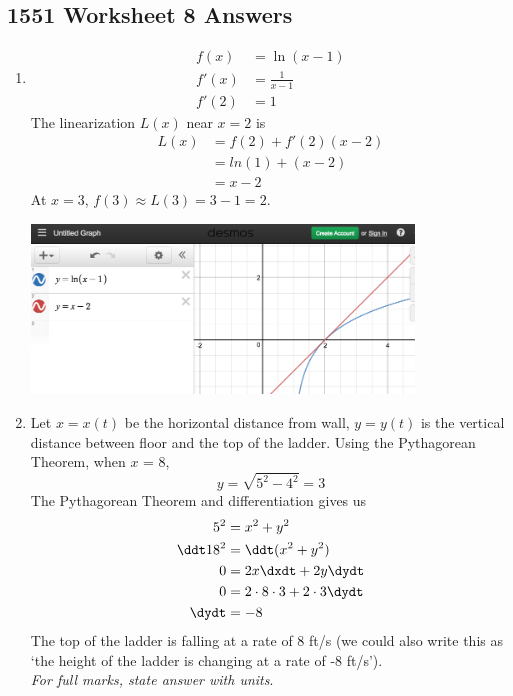 \newpage\subsection*{1551 Worksheet 8 Answers}
\begin{enumerate}
    
    \item \begin{align*}
     f(x) &= \ln(x-1) \\
     f'(x) &= \frac{1}{x-1} \\
     f'(2) &= 1   
     \end{align*}
	The linearization $L(x)$ near $x = 2$ is
    \begin{align*}
     L(x) &= f(2) + f'(2)(x - 2) \\
     &= ln(1) + (x - 2) \\
     &= x - 2
    \end{align*}
    At $x=3$, $f(3) \approx L(3) = 3 - 1 = 2$. 
    
	\begin{center}
		\includegraphics[width=0.8\textwidth]{images/imgWS8ln.png} 
	\end{center}    
    
    
    \item Let $x=x(t)$ be the horizontal distance from wall, $y=y(t)$ is the vertical distance between floor and the top of the ladder. Using the Pythagorean Theorem, when $x$ = 8, $$y = \sqrt{5^2 -4^2} = 3$$
    The Pythagorean Theorem and differentiation gives us
    \begin{align*}
    	5^2 &= x^2 + y^2 \\
        \ddt 18^2 &= \ddt (x^2 + y^2) \\
        0 &= 2x \dxdt + 2y \dydt \\
        0 &= 2\cdot 8 \cdot 3 + 2\cdot 3 \dydt \\
        \dydt &= -8 
    \end{align*}
	The top of the ladder is falling at a rate of 8 ft/s (we could also write this as `the height of the ladder is changing at a rate of -8 ft/s'). \\[12pt] \textit{For full marks, state answer with units}.
    

\end{enumerate}
